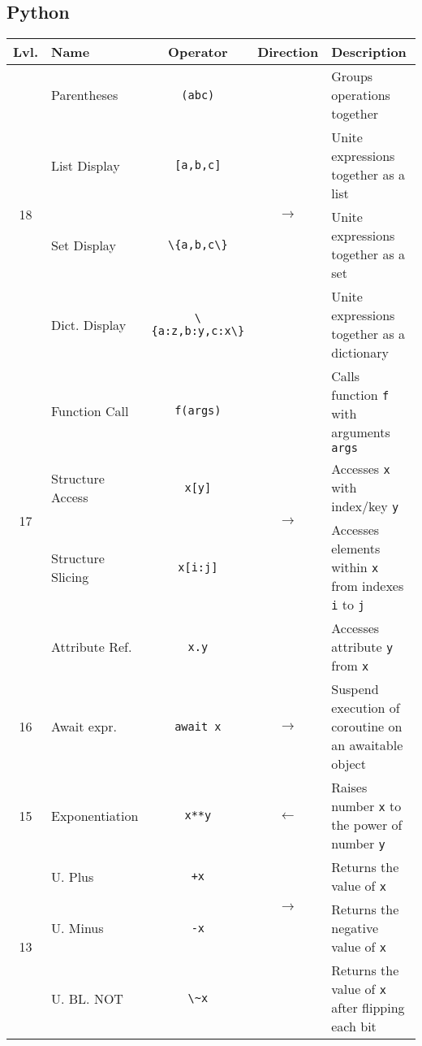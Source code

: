 \documentclass{article}
\begin{document}
\subsection{Python} %
\begin{center}\begin{tabularx}{\textwidth}{clccX}\toprule
Lvl. & \quad Name & Operator & Direction & \qquad Description \\\midrule

\multirow{4}{*}{18} & Parentheses & \lstinline|(abc)| & \multirow{4}{*}{\(\to\)} & Groups operations together \\
& List Display & \lstinline|[a,b,c]| & & Unite expressions together as a list\\
& Set Display & \lstinline|\{a,b,c\}| & & Unite expressions together as a set\\
& Dict. Display & \lstinline|\{a:z,b:y,c:x\}| & & Unite expressions together as a dictionary\\\midrule

\multirow{4}{*}{17} & Function Call & \lstinline|f(args)| & \multirow{4}{*}{\(\to\)} & Calls function \lstinline|f| with arguments \lstinline|args|\\
& Structure Access & \lstinline|x[y]| & & Accesses \lstinline|x| with index/key \lstinline|y|\\
& Structure Slicing & \lstinline|x[i:j]| & & Accesses elements within \lstinline|x| from indexes \lstinline|i| to \lstinline|j|\\
& Attribute Ref. & \lstinline|x.y| & & Accesses attribute \lstinline|y| from \lstinline|x|\\\midrule

16 & Await expr. & \lstinline|await x| & \(\to\) & Suspend execution of coroutine on an awaitable object\\\midrule
15 & Exponentiation & \lstinline|x**y| & \(\gets\) & Raises number \lstinline|x| to the power of number \lstinline|y|\\\midrule

\multirow{3}{*}{13} & U. Plus & \lstinline|+x| & \multirow{2}{*}{\(\to\)} & Returns the value of \lstinline|x|\\
& U. Minus          & \lstinline|-x|  & & Returns the negative value of \lstinline|x|\\
& U. BL. NOT        & \lstinline|\~x| & & Returns the value of \lstinline|x| after flipping each bit\\\midrule


\end{tabularx}
\end{center}
\end{document}
